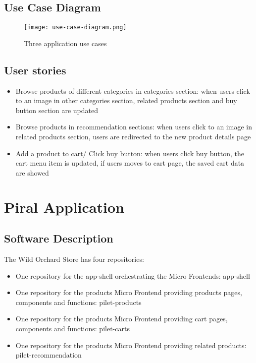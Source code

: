 \documentclass[a4paper]{book}
\begin{document}
\subsection{Use Case Diagram}
\begin{figure}[ht]
  \centering
  \captionsetup{justification=centering}
  \texttt{[image: use-case-diagram.png]}
  \caption{Three application use cases}
  \label{fig:use-case-diagram}
\end{figure}

\subsection{User stories}

\begin{itemize}
    \item Browse products of different categories in categories section: when users click to an image in other categories section, related products section and buy button section are updated
    \item Browse products in recommendation sections: when users click to an image in related products section, users are redirected to the new product details page
    \item Add a product to cart/ Click buy button: when users click buy button, the cart menu item is updated, if users moves to cart page, the saved cart data are showed
\end{itemize}

\section{Piral Application} \label{Piral Application}
\subsection{Software Description}
The Wild Orchard Store has four repositories:
\begin{itemize}
    \item One repository for the app-shell orchestrating the Micro Frontends: app-shell
    \item One repository for the products Micro Frontend providing products pages, components and functions: pilet-products
    \item One repository for the products Micro Frontend providing cart pages, components and functions: pilet-carts
    \item One repository for the products Micro Frontend providing related products: pilet-recommendation
\end{itemize}
			
\end{document}

